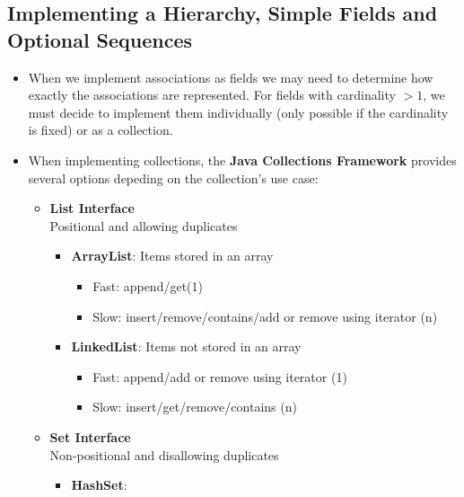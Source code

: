 \documentclass[letterpaper] {article}
\begin{document}
    \subsection{Implementing a Hierarchy, Simple Fields and Optional Sequences}
    \begin{itemize}
        \item When we implement associations as fields we may need to determine how exactly the associations are represented. For fields with cardinality $>1$, we must decide to implement them individually (only possible if the cardinality is fixed) or as a collection. 
        \item When implementing collections, the \textbf{Java Collections Framework} provides several options depeding on the collection's use case:
             \begin{itemize}
                 \item \textbf{List Interface} \\
                     Positional and allowing duplicates
                     \begin{itemize}
                         \item \textbf{ArrayList}:
                             Items stored in an array
                             \begin{itemize}
                                 \item Fast: append/get(1)
                                 \item Slow: insert/remove/contains/add or remove using iterator (n)
                             \end{itemize}
                         \item \textbf{LinkedList}:
                             Items not stored in an array
                             \begin{itemize}
                                 \item Fast: append/add or remove using iterator (1)
                                 \item Slow: insert/get/remove/contains (n)
                             \end{itemize}
                     \end{itemize}
                 \item \textbf{Set Interface} \\
                     Non-positional and disallowing duplicates
                     \begin{itemize}
                         \item \textbf{HashSet}:

\end{itemize}
\end{itemize}
\end{itemize}
\end{document}
